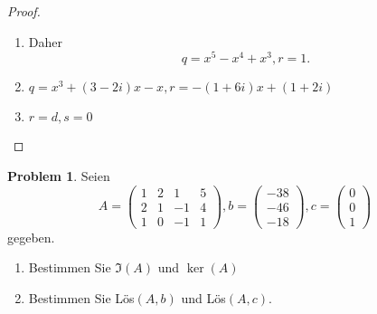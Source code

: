 \documentclass[prb,12pt]{revtex4-2}
\theoremstyle{definition}
\newtheorem{Problem}{Problem}
\theoremstyle{definition}
\newenvironment{parts}{\begin{enumerate}[label=(\alph*)]}{\end{enumerate}}
\begin{document}
\begin{proof}
	\begin{parts}
	\item 

		Daher
		\[
		q=x^5-x^4+x^3, r=1
		.\]
	\item $q=x^3+(3-2i)x-x, r=-(1+6i)x+(1+2i)$
	\item $r=d, s=0$
	\end{parts}
\end{proof}

\begin{Problem}
	Seien
	\[A=\begin{pmatrix} 1 & 2 & 1 & 5 \\ 2 & 1 & -1 & 4 \\ 1 & 0 & -1 & 1 \end{pmatrix}, b=\begin{pmatrix} -38 \\ -46 \\ -18 \end{pmatrix} , c=\begin{pmatrix} 0 \\ 0 \\ 1 \end{pmatrix}  \]
	gegeben.
	\begin{parts}
	\item Bestimmen Sie $\Im(A)$ und $\ker(A)$ 
	\item Bestimmen Sie L\"{o}s$(A, b)$ und L\"{o}s$(A, c)$.
	\end{parts}
\end{Problem}
\end{document}
